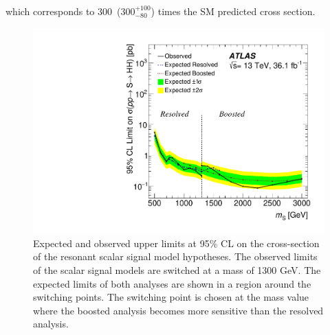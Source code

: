 which corresponds to 300~(300$^{+100}_{-80}$) times the SM predicted cross section.
\begin{figure}[!h]
\begin{center}
\includegraphics[height=0.95\textwidth]{figures/paper_figures/limit_2016_reOpt_HiggsApproved_Scalar_Paper_Combined_20190312_01}
\end{center}
\caption[Expected and observed cross section upper limit for the combines analysis]{Expected and observed upper limits at 95\% CL  on the cross-section of the resonant scalar signal model hypotheses. The observed limits of the scalar signal models are switched at a mass of 1300 GeV. The expected limits of both analyses are shown in a region around the switching points.
The switching point is chosen at the mass value where the boosted analysis becomes more sensitive than the resolved analysis. }
\label{fig:combined_scalar_limit}
\end{figure}
\FloatBarrier
 